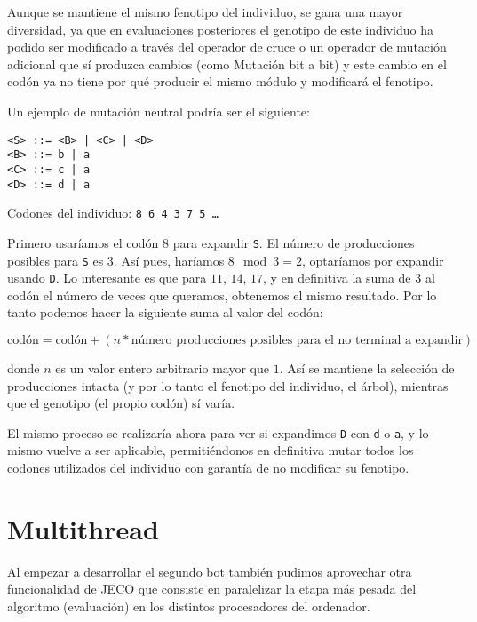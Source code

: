 Aunque se mantiene el mismo fenotipo del individuo, se gana una mayor diversidad, ya que en evaluaciones posteriores el genotipo de este individuo ha podido ser modificado a través del operador de cruce o un operador de mutación adicional que sí produzca cambios (como Mutación bit a bit) y este cambio en el codón ya no tiene por qué producir el mismo módulo y modificará el fenotipo.

Un ejemplo de mutación neutral podría ser el siguiente:

\begin{lstlisting}[caption=Gramática e individuo de ejemplo para aplicar mutación neutral]
<S> ::= <B> | <C> | <D>
<B> ::= b | a
<C> ::= c | a
<D> ::= d | a 
\end{lstlisting}

Codones del individuo: \texttt{8 6 4 3 7 5 \dots}

Primero usaríamos el codón $8$ para expandir \texttt{S}. El número de producciones posibles para \texttt{S} es $3$. Así pues, haríamos $8 \mod 3 = 2$, optaríamos por expandir usando \texttt{D}.
Lo interesante es que para $11$, $14$, $17$, y en definitiva la suma de $3$ al codón el número de veces que queramos, obtenemos el mismo resultado. Por lo tanto podemos hacer la siguiente suma al valor del codón:

\begin{equation*}
\textrm{codón} = \textrm{codón} + (n * \textrm{número producciones posibles para el no terminal a expandir})
\end{equation*}

donde $n$ es un valor entero arbitrario mayor que $1$. Así se mantiene la selección de producciones intacta (y por lo tanto el fenotipo del individuo, el árbol), mientras que el genotipo (el propio codón) sí varía.

El mismo proceso se realizaría ahora para ver si expandimos \texttt{D} con \texttt{d} o \texttt{a}, y lo mismo vuelve a ser aplicable, permitiéndonos en definitiva mutar todos los codones utilizados del individuo con garantía de no modificar su fenotipo.

\section{Multithread}
Al empezar a desarrollar el segundo bot también pudimos aprovechar otra funcionalidad de JECO que consiste en paralelizar la etapa más pesada del algoritmo (evaluación) en los distintos procesadores del ordenador.

